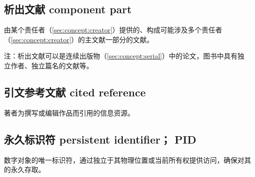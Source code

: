 \documentclass[twoside]{article}%
\begin{document}
{\subsection{析出文献 component part}
由某个责任者（\ref{sec:concept:creator}）提供的、构成可能涉及多个责任者
（\ref{sec:concept:creator}）的主文献一部分的文献。

注：析出文献可以是连续出版物（\ref{sec:concept:serial}）中的论文，图书中具有独立作者、独立篇名的文献等。

\subsection{引文参考文献 cited reference}\label{sec:concept:citeref}
著者为撰写或编辑作品而引用的信息资源。

\subsection{永久标识符 persistent identifier； PID}\label{sec:concept:pid}
数字对象的唯一标识符，通过独立于其物理位置或当前所有权提供访问，确保对其的永久存取。

}
\end{document}
